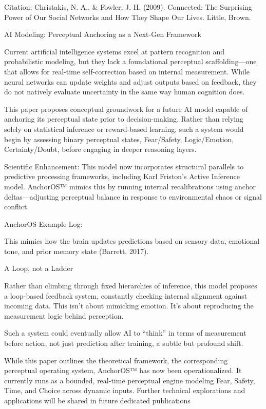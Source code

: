 \documentclass[11pt]{article}
\begin{document}
Citation: Christakis, N. A., & Fowler, J. H. (2009). Connected: The Surprising Power of Our Social Networks and How They Shape Our Lives. Little, Brown.

AI Modeling: Perceptual Anchoring as a Next-Gen Framework

Current artificial intelligence systems excel at pattern recognition and probabilistic modeling, but they lack a foundational perceptual scaffolding—one that allows for real-time self-correction based on internal measurement. While neural networks can update weights and adjust outputs based on feedback, they do not natively evaluate uncertainty in the same way human cognition does.

This paper proposes conceptual groundwork for a future AI model capable of anchoring its perceptual state prior to decision-making. Rather than relying solely on statistical inference or reward-based learning, such a system would begin by assessing binary perceptual states, Fear/Safety, Logic/Emotion, Certainty/Doubt, before engaging in deeper reasoning layers.

Scientific Enhancement: This model now incorporates structural parallels to predictive processing frameworks, including Karl Friston’s Active Inference model. AnchorOS™ mimics this by running internal recalibrations using anchor deltas—adjusting perceptual balance in response to environmental chaos or signal conflict.

AnchorOS Example Log:

This mimics how the brain updates predictions based on sensory data, emotional tone, and prior memory state (Barrett, 2017).

A Loop, not a Ladder

Rather than climbing through fixed hierarchies of inference, this model proposes a loop-based feedback system, constantly checking internal alignment against incoming data. This isn’t about mimicking emotion. It’s about reproducing the measurement logic behind perception.

Such a system could eventually allow AI to “think” in terms of measurement before action, not just prediction after training, a subtle but profound shift.

While this paper outlines the theoretical framework, the corresponding perceptual operating system, AnchorOS™ has now been operationalized. It currently runs as a bounded, real-time perceptual engine modeling Fear, Safety, Time, and Choice across dynamic inputs. Further technical explorations and applications will be shared in future dedicated publications
\end{document}

